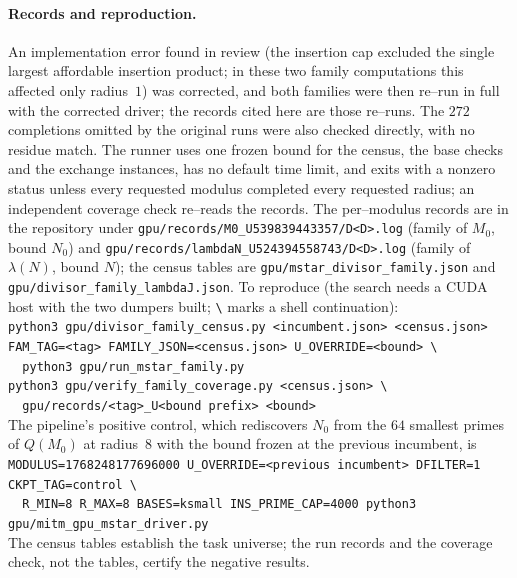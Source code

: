 \documentclass[11pt]{article}
\theoremstyle{definition}
\newcommand{\code}[1]{\texttt{#1}}
\begin{document}
\paragraph{Records and reproduction.}
An implementation error found in review (the insertion cap excluded the single largest affordable
insertion product; in these two family computations this affected only radius~$1$) was corrected,
and both families were then re--run in full with the corrected driver; the records cited here are
those re--runs. The $272$ completions omitted by the original runs were also checked directly, with
no residue match. The runner uses one frozen bound for the census, the base checks and the exchange
instances, has no default time limit, and exits with a nonzero status unless every requested modulus
completed every requested radius; an independent coverage check re--reads the records. The
per--modulus records are in the repository under
\code{gpu/records/M0\_U539839443357/D<D>.log} (family of $M_0$, bound $N_0$) and
\code{gpu/records/lambdaN\_U524394558743/D<D>.log} (family of $\lambda(N)$, bound $N$); the census
tables are \code{gpu/mstar\_divisor\_family.json} and \code{gpu/divisor\_family\_lambdaJ.json}. To
reproduce (the search needs a CUDA host with the two dumpers built; \code{\textbackslash} marks a
shell continuation):\\
{\small\code{python3 gpu/divisor\_family\_census.py <incumbent.json> <census.json>}}\\
{\small\code{FAM\_TAG=<tag> FAMILY\_JSON=<census.json> U\_OVERRIDE=<bound> \textbackslash}}\\
{\small\code{\ \ python3 gpu/run\_mstar\_family.py}}\\
{\small\code{python3 gpu/verify\_family\_coverage.py <census.json> \textbackslash}}\\
{\small\code{\ \ gpu/records/<tag>\_U<bound prefix> <bound>}}\\
The pipeline's positive control, which rediscovers $N_0$ from the $64$ smallest primes of $Q(M_0)$ at
radius~$8$ with the bound frozen at the previous incumbent, is\\
{\small\code{MODULUS=1768248177696000 U\_OVERRIDE=<previous incumbent> DFILTER=1 CKPT\_TAG=control \textbackslash}}\\
{\small\code{\ \ R\_MIN=8 R\_MAX=8 BASES=ksmall INS\_PRIME\_CAP=4000 python3 gpu/mitm\_gpu\_mstar\_driver.py}}\\
The census tables establish the task universe; the run records and the coverage check, not the
tables, certify the negative results.
\end{document}
